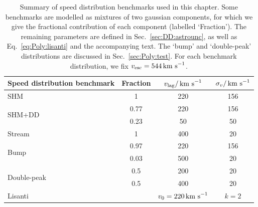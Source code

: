 \begin{table}[t]
  \setlength{\extrarowheight}{2pt}
  \setlength{\tabcolsep}{3pt}
  \begin{center}
	\begin{tabular}{m{3cm}|ccc}
        \hline \hline
	Speed distribution benchmark & Fraction & $v_\textrm{lag} / \,\textrm{km s}^{-1}$ & $\sigma_v / \,\textrm{km s}^{-1}$ \\
        \hline
	SHM & 1 & 220 & 156 \\
	\hline
	\multirow{2}{*}{SHM+DD} & 0.77 & 220 & 156 \\
	& 0.23 & 50 & 50 \\
	\hline
	Stream & 1 & 400 & 20 \\
	\hline
	\multirow{2}{*}{Bump} & 0.97 & 220 & 156 \\
	& 0.03 & 500 & 20 \\
	\hline
	\multirow{2}{*}{Double-peak} & 0.5 & 200 & 20 \\
	& 0.5 & 400 & 20 \\
	\hline
	Lisanti \etal & & $v_0 = 220 \,\textrm{km s}^{-1}$ & $k = 2$ \\
        \hline \hline
	\end{tabular}
        
  \end{center}
\caption[Summary of speed distribution benchmarks used in Chapter \ref{ch:Poly}]{Summary of speed distribution benchmarks used in this chapter. Some benchmarks are modelled as mixtures of two gaussian components, for which we give the fractional contribution of each component (labelled `Fraction'). The remaining parameters are defined in Sec.~\ref{sec:DD:astrounc}, as well as Eq.~\ref{eq:Poly:lisanti} and the accompanying text. The `bump' and `double-peak' distributions are discussed in Sec.~\ref{sec:Poly:test}. For each benchmark distribution, we fix $\vesc = 544 \kms$.}
\label{tab:Poly:distributions}
\end{table}

